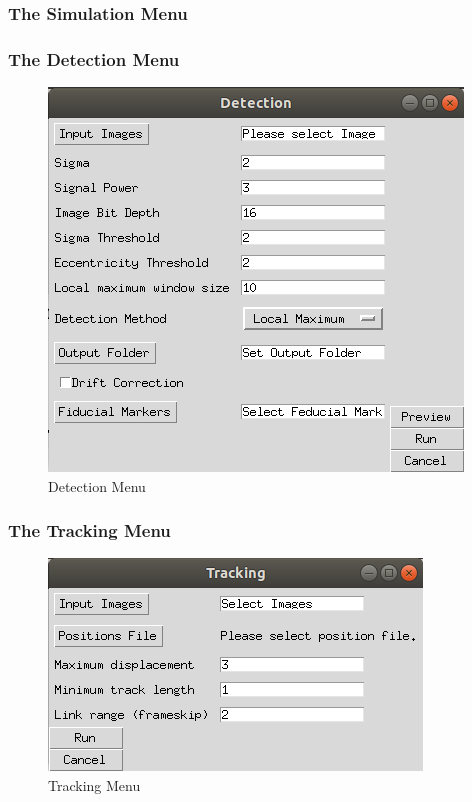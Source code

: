 \documentclass[oneside,letterpaper]{scrartcl}
\def\myscale{0.55}
\begin{document}
\subsubsection{The Simulation Menu}

\subsubsection{The Detection Menu}

\begin{figure}
\centering
\includegraphics[scale=\myscale]{Figures/DetectionGUI.jpg}
\caption{Detection Menu}
\end{figure}



\subsubsection{The Tracking Menu}
\begin{figure}
\centering
\includegraphics[scale=\myscale]{Figures/TrackingGUI.jpg}
\caption{Tracking Menu}
\end{figure}
\end{document}
